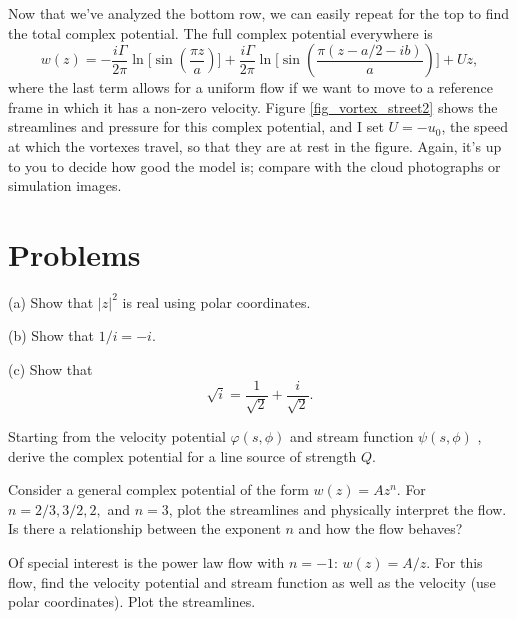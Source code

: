 Now that we've analyzed the bottom row, we can easily repeat for the top to find the total complex potential.  The full complex potential everywhere is
\begin{equation}
w(z) = -\frac{i\Gamma}{2\pi}\ln \biggl[ \sin \left( \frac{\pi z}{a} \right) \biggr] + \frac{i\Gamma}{2\pi}\ln \biggl[ \sin \left( \frac{\pi (z - a/2 - ib)}{a} \right) \biggr] + Uz,
\end{equation}
where the last term allows for a uniform flow if we want to move to a reference frame in which it has a non-zero velocity.  Figure \ref{fig_vortex_street2} shows the streamlines and pressure for this complex potential, and I set $U = -u_0$, the speed at which the vortexes travel, so that they are at rest in the figure.  Again, it's up to you to decide how good the model is; compare with the cloud photographs or simulation images.




\section*{Problems}
%

\begin{problem}

(a) Show that $|z|^2$ is real using polar coordinates.

(b) Show that $1/i = -i$.

(c) Show that
\[
\sqrt{i} = \frac{1}{\sqrt{2}} + \frac{i}{\sqrt{2}}.
\]
\end{problem}


\begin{problem}
\label{prob_line_source_w}
Starting from the velocity potential $\varphi(s, \phi)$ and stream function $\psi(s, \phi)$ , derive the complex potential for a line source of strength $Q$.
\end{problem}


\begin{problem}
Consider a general complex potential of the form $w(z) = Az^n$.  For $n = 2/3, 3/2, 2,$ and $n = 3$, plot the streamlines and physically interpret the flow.  Is there a relationship between the exponent $n$ and how the flow behaves?
\end{problem}

\begin{problem}
Of special interest is the power law flow with $n = -1$: $w(z) = A/z$.  For this flow, find the velocity potential and stream function as well as the velocity (use polar coordinates).  Plot the streamlines.
\end{problem}

